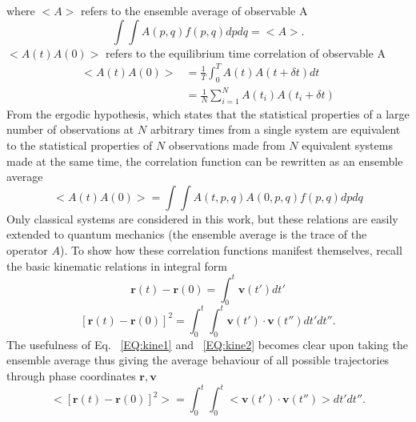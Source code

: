 %
where $<A>$ refers to the ensemble average of observable A
\begin{equation}
\int \int A(p,q) f(p,q) dpdq=<A>.
\end{equation}
$<A(t)A(0)>$ refers to the equilibrium time correlation of observable A
\begin{equation}
\begin{split}
<A(t)A(0)>&=\frac{1}{T}\int_0^TA(t)A(t+\delta t)dt\\
&=\frac{1}{N}\sum_{i=1}^NA(t_i)A(t_i+\delta t)
\end{split}
\end{equation}
From the ergodic hypothesis, which states that the statistical properties of a large number of observations at $N$ arbitrary times from a single system are equivalent to the statistical properties of $N$ observations made from $N$ equivalent systems made at the same time, the correlation function can be rewritten as an ensemble average \cite{mcquarrie2000statistical}
\begin{equation}
<A( t)A(0)>=\int \int A(t,p,q)A(0,p,q) f(p,q) dpdq 
\end{equation}
Only classical systems are considered in this work, but these relations are easily extended to quantum mechanics (the ensemble average is the trace of the operator $A$). To show how these correlation functions manifest themselves, recall the basic kinematic relations in integral form
%
\begin{equation} \label{EQ:kine1}
\bm{r}(t)-\bm{r}(0)=\int_0^t \bm{v}(t')dt'
\end{equation}
\begin{equation} \label{EQ:kine2}
[\bm{r}(t)-\bm{r}(0)]^2=\int_0^t \int_0^t \bm{v}(t')\cdot\bm{v}(t'')dt'dt''.
\end{equation}
%
The usefulness of Eq. ~\ref {EQ:kine1} and ~\ref{EQ:kine2} becomes clear upon taking the ensemble average thus giving the average behaviour of all possible trajectories through phase coordinates $\bm{r},\bm{v}$
%
\begin{equation}
<[\bm{r}(t)-\bm{r}(0)]^2>=\int_0^t \int_0^t <\bm{v}(t')\cdot\bm{v}(t'')>dt'dt''.
\end{equation}
